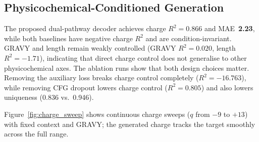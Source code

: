 \subsection{Physicochemical-Conditioned Generation}
\label{sec:res_gen}

\begin{table}[h]
\centering
\caption{Physicochemical generation-control ablation.
  All variants share the frozen JEPA encoder.
  Values are charge $R^2$ and MAE over 2{,}000 generated sequences across
  10 target conditions (\texttt{eval\_results/generation\_control\_formal}).}
\label{tab:gen_ablation}
\end{table}

The proposed dual-pathway decoder achieves charge $R^2{=}\mathbf{0.866}$ and
MAE~\textbf{2.23}, while both baselines have negative charge $R^2$ and are
condition-invariant.
GRAVY and length remain weakly controlled (GRAVY $R^2{=}0.020$, length
$R^2{=}{-}1.71$), indicating that direct charge control does not generalise to
other physicochemical axes.
The ablation runs show that both design choices matter.
Removing the auxiliary loss breaks charge control completely
($R^2{=}{-}16.763$), while removing CFG dropout lowers charge control
($R^2{=}0.805$) and also lowers uniqueness (0.836 vs.\ 0.946).

Figure~\ref{fig:charge_sweep} shows continuous charge sweeps ($q$ from $-9$ to
$+13$) with fixed context and GRAVY; the generated charge tracks the target
smoothly across the full range.

